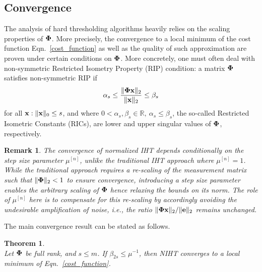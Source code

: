 \documentclass{article}
\newtheorem{theorem}{Theorem}
\newtheorem{remark}{Remark}
\begin{document}
\subsection{Convergence} 
The analysis of hard thresholding algorithms heavily relies on the scaling properties of ${\bf \Phi}$. More precisely, the convergence to a local minimum of the cost function Eqn.~\ref{cost_function} as well as the quality of such approximation are proven under certain conditions on ${\bf \Phi}$. More concretely, one must often deal with non-symmetric Restricted Isometry Property (RIP) condition: a matrix ${\bf \Phi}$ satisfies non-symmetric RIP if
\begin{equation}\label{rip}
\alpha_{s} \leq \frac{\|{\bf \Phi} {\bf x}\|_2}{\|{\bf x}\|_2} \leq \beta_{s}
\end{equation}
for all ${\bf x}: \|{\bf x}\|_0 \leq s$, and where $0<\alpha_s, \beta_s \in \mathbb{R}, \ \alpha_s\leq \beta_s$, the so-called Restricted Isometric Constants (RICs), are lower and upper singular values of ${\bf \Phi}$, respectively.

\begin{remark}\label{remark_noise_amp}
The convergence of normalized IHT depends conditionally on the step size parameter $\mu^{[n]}$, unlike the traditional IHT approach where $\mu^{[n]}=1$.
While the traditional approach requires a re-scaling of the measurement matrix such that $\|{\bf \Phi}\|_2 <1$ to ensure convergence, introducing a step size parameter enables the arbitrary scaling of ${\bf \Phi}$ hence relaxing the bounds on its norm. The role of $\mu^{[n]}$ here is to compensate for this re-scaling by accordingly avoiding the undesirable amplification of noise, i.e., the ratio $\|{\bf \Phi x}\|_2/\|{\bf e}\|_2$ remains unchanged. 
\end{remark}
The main convergence result can be stated as follows.
\begin{theorem}\label{theorem_convergence_IHT}
{\rm{\cite{blumensath2012greedy}}}\\ 
Let ${\bf \Phi}$ be full rank, and $s\leq m$. If $\beta_{2s}\leq\mu^{-1}$, then NIHT converges to a local minimum of Eqn.~\ref{cost_function}.
\end{theorem}
\end{document}
